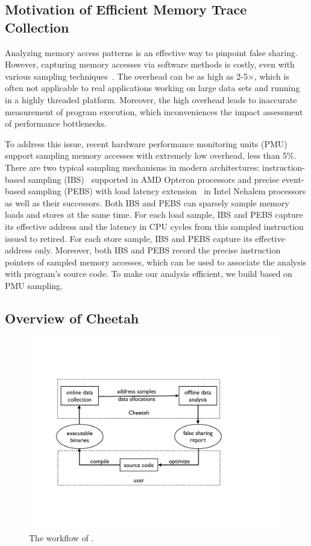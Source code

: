 \sloppy
\subsection{Motivation of Efficient Memory Trace Collection}
\label{sec:sampling}
Analyzing memory access patterns is an effective way to pinpoint false sharing. However, capturing memory accesses via software methods is costly, even with various sampling techniques~\cite{macpo,SLO2}. The overhead can be as high as 2-5$\times$, which is often not applicable to real applications working on large data sets and running in a highly threaded platform. Moreover, the high overhead leads to inaccurate measurement of program execution, which inconveniences the impact assessment of performance bottlenecks.

To address this issue, recent hardware performance monitoring units (PMU) support sampling memory accesses with extremely low overhead, less than 5\%. There are two typical sampling mechanisms in modern architectures: instruction-based sampling (IBS)~\cite{AMDIBS:07} supported in AMD Opteron processors and precise event-based sampling (PEBS) with load latency extension~\cite{IntelArch:PEBS:Sept09} in Intel Nehalem processors as well as their successors. Both IBS and PEBS can sparsely sample memory loads and stores at the same time. For each load sample, IBS and PEBS capture its effective address and the latency in CPU cycles from this sampled instruction issued to retired. For each store sample, IBS and PEBS capture its effective address only. Moreover, both IBS and PEBS record the precise instruction pointers of sampled memory accesses, which can be used to associate the analysis with program's source code. To make our analysis efficient, we build \Cheetah{} based on PMU sampling. 

 \subsection{Overview of Cheetah}

\begin{figure}[htbp]
\centering
\includegraphics[width=\columnwidth]{figure/workflow}
\caption{The workflow of \cheetah{}.}
\label{fig:workflow}
\end{figure}

